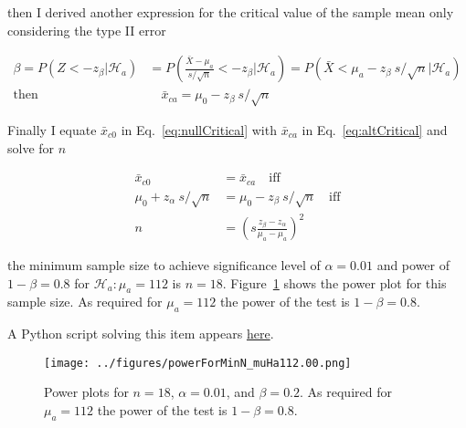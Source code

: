 \documentclass[12pt]{article}
\begin{document}
\begin{enumerate}
\begin{enumerate}
                then I derived another expression for the critical value of the
                sample mean only considering the type II error

                \begin{align}
                    \beta=P(Z<-z_\beta|\mathcal{H}_a)&=P(\frac{\bar{X}-\mu_a}{s/\sqrt{n}}<-z_\beta|\mathcal{H}_a)=P(\bar{X}<\mu_a-z_\beta\
                    s/\sqrt{n}|\mathcal{H}_a)\nonumber\\
                    \text{then}&\quad\bar{x}_{ca}=\mu_0-z_\beta\ s/\sqrt{n}\label{eq:altCritical}
                \end{align}

                Finally I equate $\bar{x}_{c0}$ in Eq.~\ref{eq:nullCritical}
                with $\bar{x}_{ca}$ in Eq.~\ref{eq:altCritical} and solve for
                $n$

                \begin{align*}
                    \bar{x}_{c0}&=\bar{x}_{ca}\quad\text{iff}\\
                    \mu_0+z_\alpha\ s/\sqrt{n}&=\mu_0-z_\beta\ s/\sqrt{n}\quad\text{iff}\\
                    n&=\left(s\frac{z_\beta-z_\alpha}{\mu_a-\mu_a}\right)^2
                \end{align*}

                the minimum sample size to achieve significance level of
                $\alpha=0.01$ and power of $1-\beta=0.8$ for $\mathcal{H}_a:
                \mu_a=112$ is $n=18$. Figure~\ref{fig:powerPlotForMinN} shows
                the power plot for this sample size. As required for
                $\mu_a=112$ the power of the test is $1-\beta=0.8$.

                A Python script solving this item appears
                \href{https://github.com/joacorapela/neuroinformatics24/blob/master/worksheets/01_tTestAndRandomizationTests/mySolution/code/doPowerExd.py}{here}.

                \begin{figure}
                    \begin{center}
                        \texttt{[image: ../figures/powerForMinN\_muHa112.00.png]}
                    \end{center}
                    \caption{Power plots for $n=18$, $\alpha=0.01$, and
                    $\beta=0.2$. As required for $\mu_a=112$ the power of the
                    test is $1-\beta=0.8$.}
                    \label{fig:powerPlotForMinN}
                \end{figure}


        \end{enumerate}
\end{enumerate}
\end{document}
